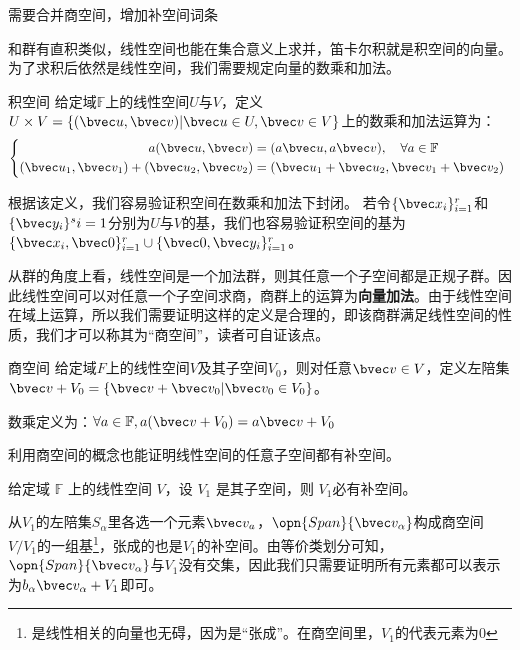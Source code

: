 

\begin{issues}
\issueTODO 需要合并商空间，增加补空间词条
\end{issues}


和群有直积类似，线性空间也能在集合意义上求并，笛卡尔积就是积空间的向量。为了求积后依然是线性空间，我们需要规定向量的数乘和加法。

\begin{definition}{积空间}
给定域$\mathbb F $上的线性空间$U$与$V$，定义$U\times V=\{(\bvec u,\bvec v)|\bvec u\in U,\bvec v\in V\}$上的数乘和加法运算为：
\begin{equation}
\left\{\begin{aligned}
a(\bvec u,\bvec v)&=(a\bvec u,a\bvec v),\quad \forall a\in \mathbb F\\
(\bvec u_1,\bvec v_1)+(\bvec u_2,\bvec v_2)&=(\bvec u_1+\bvec u_2,\bvec v_1+\bvec v_2)
\end{aligned}\right.~
\end{equation}
\end{definition}
根据该定义，我们容易验证积空间在数乘和加法下封闭。
若令$\{\bvec x_i\}^r_{i=1}$和$\{\bvec y_i\}^s{i=1}$分别为$U$与$V$的基，我们也容易验证积空间的基为$\{\bvec x_i,\bvec 0\}^r_{i=1}\cup \{\bvec 0,\bvec y_i\}^r_{i=1}$。

从群的角度上看，线性空间是一个加法群，则其任意一个子空间都是正规子群。因此线性空间可以对任意一个子空间求商，商群上的运算为\textbf{向量加法}。由于线性空间在域上运算，所以我们需要证明这样的定义是合理的，即该商群满足线性空间的性质，我们才可以称其为“商空间”，读者可自证该点。
\begin{definition}{商空间}
给定域$F$上的线性空间$V$及其子空间$V_0$，则对任意$\bvec v\in V$，定义左陪集$\bvec v+V_0=\{\bvec v+\bvec v_0|\bvec v_0\in V_0\}$。

数乘定义为：$\forall a\in \mathbb F,a(\bvec v+V_0)=a\bvec v+V_0$
\end{definition}


利用商空间的概念也能证明线性空间的任意子空间都有补空间。
\begin{theorem}{}
给定域 $\mathbb F$ 上的线性空间 $V$，设 $V_1$ 是其子空间，则 $V_1$必有补空间。
\end{theorem}
从$V_1$的左陪集${S_{\alpha}}$里各选一个元素$\bvec v_a$，$\opn{Span} \{\bvec v_{\alpha}\}$构成商空间$V/V_1$的一组基\footnote{是线性相关的向量也无碍，因为是“张成”。在商空间里，$V_1$的代表元素为$0$}，张成的也是$V_1$的补空间。由等价类划分可知，$\opn{Span} \{\bvec v_{\alpha}\}$与$V_1$没有交集，因此我们只需要证明所有元素都可以表示为$b_{\alpha}\bvec v_{\alpha}+V_1$即可。

